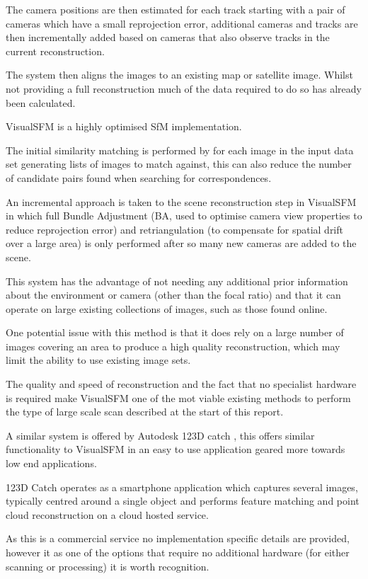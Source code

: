 \documentclass{entcs}
\begin{document}
The camera positions are then estimated for each track starting with a pair of
cameras which have a small reprojection error, additional cameras and tracks are
then incrementally added based on cameras that also observe tracks in the
current reconstruction.

The system then aligns the images to an existing map or satellite image. Whilst
not providing a full reconstruction much of the data required to do so has
already been calculated.

VisualSFM \cite{Wu2013} is a highly optimised SfM implementation.

The initial similarity matching is performed by for each image in the input
data set generating lists of images to match against, this can also reduce the
number of candidate pairs found when searching for correspondences.

An incremental approach is taken to the scene reconstruction step in VisualSFM
in which full Bundle Adjustment (BA, used to optimise camera view properties to
reduce reprojection error) and retriangulation (to compensate for spatial drift
over a large area) is only performed after so many new cameras are added to the
scene.

This system has the advantage of not needing any additional prior information
about the environment or camera (other than the focal ratio) and that it can
operate on large existing collections of images, such as those found online.

One potential issue with this method is that it does rely on a large number of
images covering an area to produce a high quality reconstruction, which may
limit the ability to use existing image sets.

The quality and speed of reconstruction and the fact that no specialist hardware
is required make VisualSFM one of the mot viable existing methods to perform the
type of large scale scan described at the start of this report.

A similar system is offered by Autodesk 123D catch \cite{Autodesk123DCatch},
this offers similar functionality to VisualSFM in an easy to use application
geared more towards low end applications.

123D Catch operates as a smartphone application which captures several images,
typically centred around a single object and performs feature matching and point
cloud reconstruction on a cloud hosted service.

As this is a commercial service no implementation specific details are provided,
however it as one of the options that require no additional hardware (for either
scanning or processing) it is worth recognition.
\end{document}

